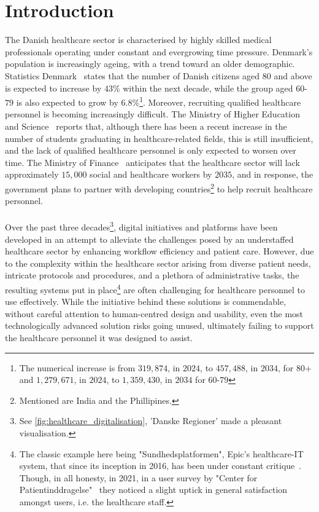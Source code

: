 \section{Introduction}
The Danish healthcare sector is characterised by highly skilled medical professionals operating under constant and evergrowing time pressure.
Denmark's population is increasingly ageing, with a trend toward an older demographic. Statistics Denmark~\cite{dst-older-pop} states that the number of Danish citizens aged $80$ and above is expected to increase by $43$\% within the next decade, while the group aged $60$-$79$ is also expected to grow by $6.8$\%\footnote{The numerical increase is from $319,874$, in $2024$, to $457,488$, in $2034$, for $80$+ and $1,279,671$, in $2024$, to $1,359,430$, in $2034$ for $60$-$79$}. Moreover, recruiting qualified healthcare personnel is becoming increasingly difficult. The Ministry of Higher Education and Science~\cite{MoHEaS-healthcare-rectruitment} reports that, although there has been a recent increase in the number of students graduating in healthcare-related fields, this is still insufficient, and the lack of qualified healthcare personnel is only expected to worsen over time. The Ministry of Finance~\cite{MoHEaS-healthcare-rectruitment} anticipates that the healthcare sector will lack approximately $15,000$ social and healthcare workers by $2035$, and in response, the government plans to partner with developing countries\footnote{Mentioned are India and the Phillipines.} to help recruit healthcare personnel.
\\
\\
Over the past three decades\footnote{See \autoref{fig:healthcare_digitalisation}, 'Danske Regioner' made a pleasant visualisation.}, digital initiatives and platforms have been developed in an attempt to alleviate the challenges posed by an understaffed healthcare sector by enhancing workflow efficiency and patient care. However, due to the complexity within the healthcare sector arising from diverse patient needs, intricate protocols and procedures, and a plethora of administrative tasks, the resulting systems put in place\footnote{The classic example here being "Sundhedsplatformen", Epic's healthcare-IT system, that since its inception in 2016, has been under constant critique~\cite{DR-healthcare-platform, Altinget-healthcare-platform, TV2-healthcare-platform}. Though, in all honesty, in 2021, in a user survey by "Center for Patientinddragelse"~\cite{SP-user-survey} they noticed a slight uptick in general satisfaction amongst users, i.e. the healthcare staff.} are often challenging for healthcare personnel to use effectively. While the initiative behind these solutions is commendable, without careful attention to human-centred design and usability, even the most technologically advanced solution risks going unused, ultimately failing to support the healthcare personnel it was designed to assist.
